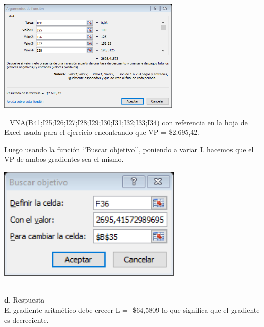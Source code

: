  \begin{center}
	\includegraphics[height=5.4cm]{img/ch8/8_20.png}
\end{center}

=VNA(B41;I25;I26;I27;I28;I29;I30;I31;I32;I33;I34) con referencia en la hoja de Excel usada para el ejercicio encontrando que VP = \$2.695,42.

\vspace{2mm}

Luego usando la función ‘’Buscar objetivo’’, poniendo a variar L hacemos que el VP de ambos gradientes sea el mismo.

\begin{center}
	\includegraphics[height=5.4cm]{img/ch8/8_21.png}
\end{center}
\\ 
\textbf{d}. Respuesta\\

El gradiente aritmético debe crecer L = -\$64,5809 lo que significa que el gradiente es decreciente.

\vspace{2mm}

